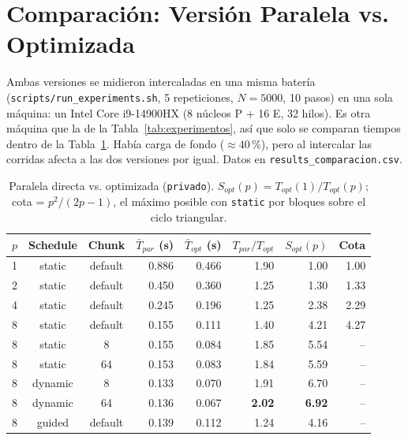 \documentclass[11pt,a4paper]{article}
\begin{document}
\section{Comparación: Versión Paralela vs. Optimizada}
\label{sec:comparacion}
Ambas versiones se midieron intercaladas en una misma batería (\texttt{scripts/run\_experiments.sh}, 5 repeticiones, $N = 5000$, 10 pasos) en una sola máquina: un Intel Core i9-14900HX (8 núcleos P + 16 E, 32 hilos). Es otra máquina que la de la Tabla~\ref{tab:experimentos}, así que solo se comparan tiempos dentro de la Tabla~\ref{tab:comparacion}. Había carga de fondo ($\approx 40$\,\%), pero al intercalar las corridas afecta a las dos versiones por igual. Datos en \texttt{results\_comparacion.csv}.

\begin{table}[h!]
\centering
\caption{Paralela directa vs. optimizada (\texttt{privado}). $S_{opt}(p) = T_{opt}(1)/T_{opt}(p)$; cota = $p^2/(2p-1)$, el máximo posible con \texttt{static} por bloques sobre el ciclo triangular.}
\label{tab:comparacion}
\small
\begin{tabular}{@{}cccrrrrr@{}}
\toprule
\textbf{$p$} & \textbf{Schedule} & \textbf{Chunk} & \textbf{$\bar{T}_{par}$ (s)} & \textbf{$\bar{T}_{opt}$ (s)} & \textbf{$T_{par}/T_{opt}$} & \textbf{$S_{opt}(p)$} & \textbf{Cota} \\ \midrule
1 & static & default & 0.886 & 0.466 & 1.90 & 1.00 & 1.00 \\
2 & static & default & 0.450 & 0.360 & 1.25 & 1.30 & 1.33 \\
4 & static & default & 0.245 & 0.196 & 1.25 & 2.38 & 2.29 \\
8 & static & default & 0.155 & 0.111 & 1.40 & 4.21 & 4.27 \\
8 & static & 8       & 0.155 & 0.084 & 1.85 & 5.54 & -- \\
8 & static & 64      & 0.153 & 0.083 & 1.84 & 5.59 & -- \\
8 & dynamic & 8      & 0.133 & 0.070 & 1.91 & 6.70 & -- \\
8 & dynamic & 64     & 0.136 & 0.067 & \textbf{2.02} & \textbf{6.92} & -- \\
8 & guided & default & 0.139 & 0.112 & 1.24 & 4.16 & -- \\ \bottomrule
\end{tabular}
\end{table}
\end{document}

